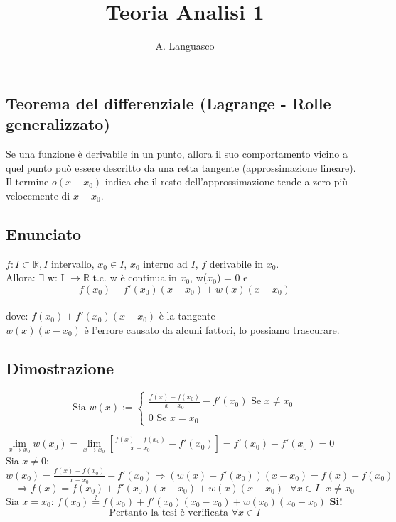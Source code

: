 \documentclass{article}
\author{A. Languasco}
\title{Teoria Analisi 1}
\newcommand{\R}{\mathbb{R}}
\newcommand{\vSpace}{\vspace{1em}}
\begin{document}
\maketitle
\tableofcontents\newpage

\begin{flushleft}

\section{Teorema del differenziale (Lagrange - Rolle generalizzato)}
Se una funzione è derivabile in un punto, allora il suo comportamento vicino a quel punto può essere descritto da una retta tangente (approssimazione lineare). Il termine 
$o(x - x_0)$ indica che il resto dell'approssimazione tende a zero più velocemente di $x - x_0$.\\
\subsection{Enunciato}
$f: I \subset \R, I$ intervallo, $x_0 \in I$, $x_0$ interno ad $I$, $f$ derivabile in $x_0$.
\\Allora: $\exists$ w: I $\rightarrow \R$ t.c. w è continua in $x_0$, w($x_0$) = 0 e
\[
    f(x_0) + f'(x_0)(x-x_0)+w(x)(x-x_0)
\]
\\dove: $f(x_0) + f'(x_0)(x-x_0)$ è la tangente
\\\hspace{2.3em} $w(x)(x-x_0)$ è l'errore causato da alcuni fattori, \underline{lo possiamo trascurare.}

\subsection{Dimostrazione}
\[
    \text{Sia }w(x) := 
    \begin{cases}
        \frac{f(x)-f(x_0)}{x - x_0} - f'(x_0) \text{ Se } x \neq x_0\\
        0 \text{ Se } x = x_0 
    \end{cases}
\]

$\lim\limits_{x \to x_0}w(x_0) = \lim\limits_{x \to x_0} [\frac{f(x)-f(x_0)}{x - x_0} - f'(x_0)] = f'(x_0) - f'(x_0) = 0$\\
Sia $ x \neq 0$: $w(x_0)=\frac{f(x)-f(x_0)}{x-x_0}-f'(x_0) \Rightarrow (w(x) - f'(x_0))(x - x_0) = f(x)-f(x_0)$
\[
\Rightarrow f(x)=f(x_0)+f'(x_0)(x-x_0) + w(x)(x - x_0) \text{ } \forall x \in I \text{ } x \neq x_0
\]
Sia $x = x_0$: $f(x_0) \stackrel{?}{=} f(x_0) + f'(x_0)(x_0-x_0)+ w(x_0)(x_0-x_0)$ \textbf{\underline{Si!}}
\vSpace
\[
\text{Pertanto la tesi è verificata } \forall x \in I
\]


\end{flushleft}
\end{document}
